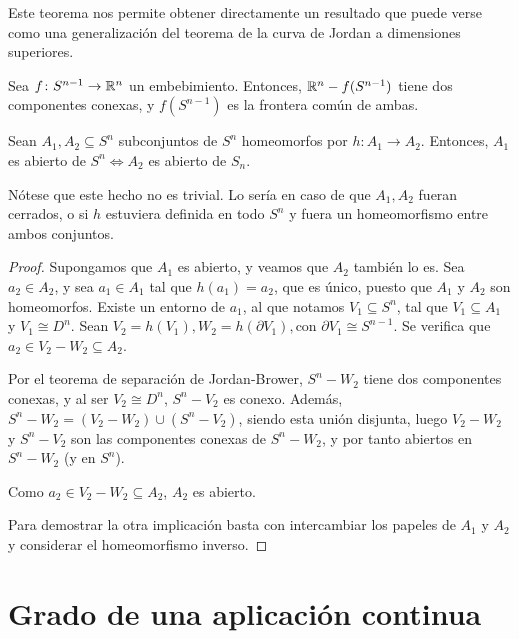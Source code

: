 Este teorema nos permite obtener directamente un resultado que puede verse como una generalización del teorema
de la curva de Jordan a dimensiones superiores.

\begin{corollary}
  Sea $f \colon S^{n-1} \to \mathbb{R}^n$ un embebimiento. Entonces, $\mathbb{R}^n - f(S^{n-1})$ tiene dos componentes conexas,
  y $f(S^{n-1})$ es la frontera común de ambas.
\end{corollary}

\begin{theorem}
  Sean $A_1, A_2 \subseteq S^n$ subconjuntos de $S^n$ homeomorfos por $h \colon A_1 \to A_2$. Entonces,
  $A_1$ es abierto de $S^n \iff A_2$ es abierto de $S_n$.
\end{theorem}

\begin{remark}
  Nótese que este hecho no es trivial. Lo sería en caso de que $A_1, A_2$ fueran cerrados, o si $h$ estuviera definida
  en todo $S^n$ y fuera un homeomorfismo entre ambos conjuntos.
\end{remark}

\begin{proof}
  Supongamos que $A_1$ es abierto, y veamos que $A_2$ también lo es. Sea $a_2 \in A_2$, y sea $a_1 \in A_1$ tal que $h(a_1) = a_2$,
  que es único, puesto que $A_1$ y $A_2$ son homeomorfos. Existe un entorno de $a_1$, al que notamos $V_1 \subseteq S^n$,
  tal que $V_1 \subseteq A_1$ y $V_1 \cong D^n$. Sean $V_2 = h(V_1), W_2 = h(\partial V_1), \text{con } \partial V_1 \cong S^{n-1}$.
  Se verifica que $a_2 \in V_2 - W_2 \subseteq A_2$.

  Por el teorema de separación de Jordan-Brower, $S^n - W_2$ tiene dos componentes conexas, y al ser $V_2 \cong D^n$,
  $S^n - V_2$ es conexo. Además, $S^n - W_2 = (V_2 - W_2) \cup (S^n - V_2)$, siendo esta unión disjunta, luego $V_2 - W_2$
  y $S^n - V_2$ son las componentes conexas de $S^n - W_2$, y por tanto abiertos en $S^n - W_2$ (y en $S^n$).

  Como $a_2 \in V_2 - W_2 \subseteq A_2$, $A_2$ es abierto.

  Para demostrar la otra implicación basta con intercambiar los papeles de $A_1$ y $A_2$ y considerar el homeomorfismo inverso.
\end{proof}

\section{Grado de una aplicación continua}

